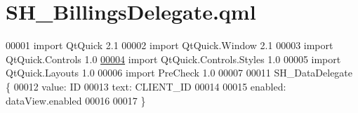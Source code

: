 \hypertarget{SH__BillingsDelegate_8qml}{\section{S\-H\-\_\-\-Billings\-Delegate.\-qml}
\label{SH__BillingsDelegate_8qml}
}

\begin{DoxyCode}
00001 \textcolor{keyword}{import} QtQuick 2.1
00002 import QtQuick.Window 2.1
00003 import QtQuick.Controls 1.0
\hypertarget{SH__BillingsDelegate_8qml_source_l00004}{}\hyperlink{classSH__BillingsDelegate}{00004} import QtQuick.Controls.Styles 1.0
00005 import QtQuick.Layouts 1.0
00006 import PreCheck 1.0
00007 
00011 SH\_DataDelegate \{
00012     value: ID
00013     text: CLIENT\_ID
00014 
00015     enabled: dataView.enabled
00016 
00017 \}
\end{DoxyCode}

